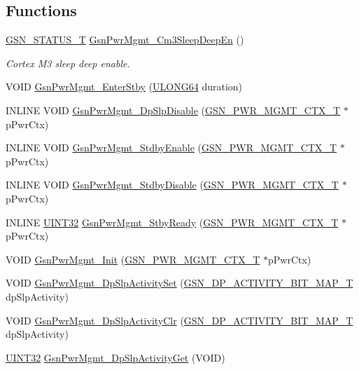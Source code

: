 \subsection*{Functions}
\begin{DoxyCompactItemize}
\item 
\hyperlink{a00659_gae36517c0f5872426a7034c9551eb96ac}{GSN\_\-STATUS\_\-T} \hyperlink{a00541_a948bdd5a7baf779d21f85c5a778a4ee3}{GsnPwrMgmt\_\-Cm3SleepDeepEn} ()
\begin{DoxyCompactList}\small\item\em Cortex M3 sleep deep enable. \end{DoxyCompactList}\item 
VOID \hyperlink{a00541_a985e139255635838aef703818afef7c2}{GsnPwrMgmt\_\-EnterStby} (\hyperlink{a00660_ga28961430434ccabca6862ea93fe9a15b}{ULONG64} duration)
\item 
INLINE VOID \hyperlink{a00541_a1befe55fa5788f77d489b4b3df4ee6a3}{GsnPwrMgmt\_\-DpSlpDisable} (\hyperlink{a00184}{GSN\_\-PWR\_\-MGMT\_\-CTX\_\-T} $\ast$pPwrCtx)
\item 
INLINE VOID \hyperlink{a00541_a6d958088b16e1cfdf234a2dfbd9870df}{GsnPwrMgmt\_\-StdbyEnable} (\hyperlink{a00184}{GSN\_\-PWR\_\-MGMT\_\-CTX\_\-T} $\ast$pPwrCtx)
\item 
INLINE VOID \hyperlink{a00541_a853ff2c926ce9571ee3bef604233417f}{GsnPwrMgmt\_\-StdbyDisable} (\hyperlink{a00184}{GSN\_\-PWR\_\-MGMT\_\-CTX\_\-T} $\ast$pPwrCtx)
\item 
INLINE \hyperlink{a00660_gae1e6edbbc26d6fbc71a90190d0266018}{UINT32} \hyperlink{a00541_aa6a7af5b633cde99e749d47ffc0ff6e1}{GsnPwrMgmt\_\-StbyReady} (\hyperlink{a00184}{GSN\_\-PWR\_\-MGMT\_\-CTX\_\-T} $\ast$pPwrCtx)
\item 
VOID \hyperlink{a00541_ae540dfb6c63bbb9a13b3554aaad3d262}{GsnPwrMgmt\_\-Init} (\hyperlink{a00184}{GSN\_\-PWR\_\-MGMT\_\-CTX\_\-T} $\ast$pPwrCtx)
\item 
VOID \hyperlink{a00541_a67ab944828e059b5efacfe4e0ada9861}{GsnPwrMgmt\_\-DpSlpActivitySet} (\hyperlink{a00541_a5b011c4f2fa22db81cedb1ff114a4bfe}{GSN\_\-DP\_\-ACTIVITY\_\-BIT\_\-MAP\_\-T} dpSlpActivity)
\item 
VOID \hyperlink{a00541_a6937e1338eeae9eea294ecb2ca7be2b4}{GsnPwrMgmt\_\-DpSlpActivityClr} (\hyperlink{a00541_a5b011c4f2fa22db81cedb1ff114a4bfe}{GSN\_\-DP\_\-ACTIVITY\_\-BIT\_\-MAP\_\-T} dpSlpActivity)
\item 
\hyperlink{a00660_gae1e6edbbc26d6fbc71a90190d0266018}{UINT32} \hyperlink{a00541_a9529b392baaf7ed9513094f6ffd33220}{GsnPwrMgmt\_\-DpSlpActivityGet} (VOID)
\end{DoxyCompactItemize}
